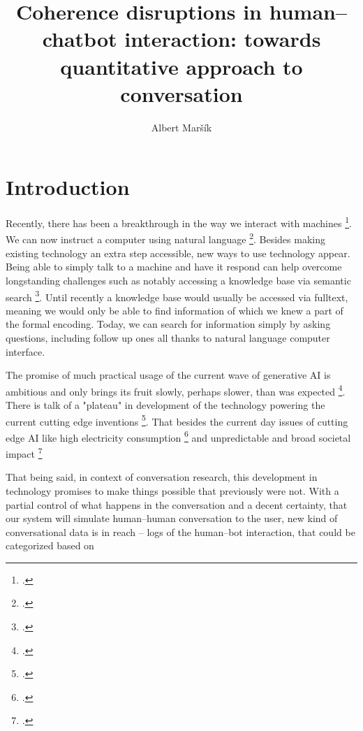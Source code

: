 \documentclass[12pt]{report}
\title{Coherence disruptions in human–chatbot interaction: towards quantitative approach to conversation}
\date{}
\author{Albert Maršík}
\begin{document}


\maketitle
\clearpage
\tableofcontents
\clearpage



\chapter*{Introduction}

\par
Recently, there has been a breakthrough in the way we interact with machines \footcite{sharma2024exploring}.
We can now instruct a computer using natural language \footcite{hendrix1982natural}.
Besides making existing technology an extra step accessible,
new ways to use technology appear.
Being able to simply talk to a machine and have it respond
can help overcome longstanding challenges
such as notably accessing a knowledge base via semantic search \footcite{makela2005survey}.
Until recently a knowledge base would usually be accessed via fulltext,
meaning we would only be able to find
information of which we knew a part of the formal encoding.
Today, we can search for information simply by asking questions,
including follow up ones
all thanks to natural language computer interface.
\par
The promise of much practical usage of the current wave of generative AI is ambitious
and only brings its fruit slowly, perhaps slower, than was expected
\footcite{bloomberg2024openai1, reuters2024openai}.
There is talk of a "plateau" in development of the technology powering
the current cutting edge inventions \footcite{ritter2024ai}.
That besides the current day issues of cutting edge AI like
high electricity consumption \footcite{ritchie2024ai} and
unpredictable and broad societal impact \footcite{hagerty2019global,baldassarre2023social}

That being said, in context of conversation research,
this development in technology promises to make things possible that previously were not.
With a partial control of what happens in the conversation and a decent certainty, that
our system will simulate human–human conversation to the user,
new kind of conversational data is in reach –
logs of the human–bot interaction, that could be categorized based on
\end{document}
